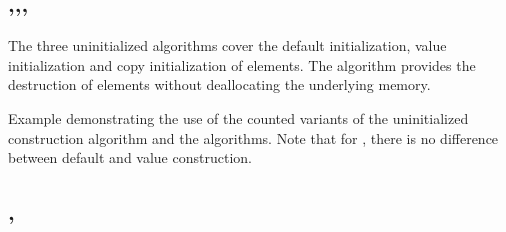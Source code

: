 \subsection{\texorpdfstring{,\newline{},\newline{}, \newline{}}{\texttt{std::uninitialized\_default\_construct},\newline\texttt{std::uninitialized\_value\_construct},\newline\texttt{std::uninitialized\_fill}, \newline\texttt{std::destroy}}}

The three uninitialized algorithms cover the default initialization, value initialization and copy initialization of elements. The  algorithm provides the destruction of elements without deallocating the underlying memory.



\begin{codebox}[]{\href{https://compiler-explorer.com/z/snnhY37xM}{\ExternalLink}}
\footnotesize Example demonstrating the use of the counted variants of the uninitialized construction algorithm and the  algorithms. Note that for , there is no difference between default and value construction.
\tcblower
{}
\end{codebox}

\subsection{\texorpdfstring{, }{\texttt{std::uninitialized\_copy}, \texttt{std::uninitalized\_move}}}

